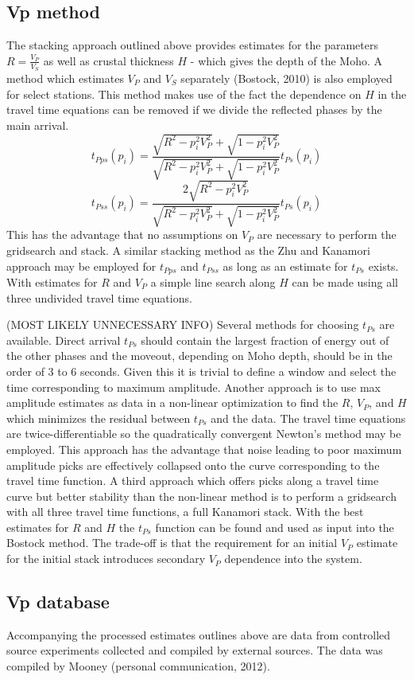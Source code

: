 \documentclass[draft, 12pt]{article}
\begin{document}
\subsection{Vp method}
   The stacking approach outlined above provides estimates for the parameters $R=\frac{V_P}{V_S}$ as well as crustal thickness $H$ - which gives the depth of the Moho. A method which estimates $V_P$ and $V_S$ separately (Bostock, 2010) is also employed for select stations. This method makes use of the fact the dependence on $H$ in the travel time equations can be removed if we divide the reflected phases by the main arrival.
$$ t_{Pps}(p_i) = \frac{ \sqrt{R^2-p_i^2V_P^2} + \sqrt{1-p_i^2V_P^2} } {\sqrt{R^2-p_i^2V_P^2} + \sqrt{1-p_i^2V_P^2} } t_{Ps}(p_i) $$
$$ t_{Pss}(p_i) = \frac{2\sqrt{R^2-p_i^2V_P^2}} {\sqrt{R^2-p_i^2V_P^2} + \sqrt{1-p_i^2V_P^2} } t_{Ps}(p_i) $$
This has the advantage that no assumptions on $V_P$ are necessary to perform the gridsearch and stack. A similar stacking method as the Zhu and Kanamori approach may be employed for $t_{Pps}$ and $t_{Pss}$ as long as an estimate for $t_{Ps}$ exists. With estimates for $R$ and $V_P$ a simple line search along $H$ can be made using all three undivided travel time equations.


(MOST LIKELY UNNECESSARY INFO)
Several methods for choosing $t_{Ps}$ are available. Direct arrival $t_{Ps}$ should contain the largest fraction of energy out of the other phases and the moveout, depending on Moho depth, should be in the order of 3 to 6 seconds. Given this it is trivial to define a window and select the time corresponding to maximum amplitude. Another approach is to use max amplitude estimates as data in a non-linear optimization to find the $R$, $V_P$, and $H$ which minimizes the residual between $t_{Ps}$ and the data. The travel time equations are twice-differentiable so the quadratically convergent Newton's method may be employed. This approach has the advantage that noise leading to poor maximum amplitude picks are effectively collapsed onto the curve corresponding to the travel time function. A third approach which offers picks along a travel time curve but better stability than the non-linear method is to perform a gridsearch with all three travel time functions, a full Kanamori stack. With the best estimates for $R$ and $H$ the $t_{Ps}$ function can be found and used as input into the Bostock method. The trade-off is that the requirement for an initial $V_P$ estimate for the initial stack introduces secondary $V_P$ dependence into the system.

\subsection{Vp database}
   Accompanying the processed estimates outlines above are data from controlled source experiments collected and compiled by external sources. The data was compiled by Mooney (personal communication, 2012).
\end{document}
